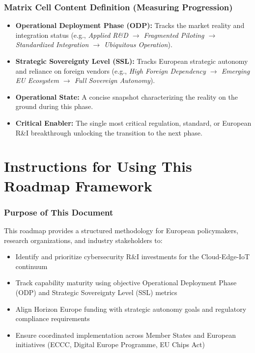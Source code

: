 \documentclass[12pt,a4paper]{report}
\begin{document}
\subsection*{Matrix Cell Content Definition (Measuring Progression)}
\begin{itemize}
    \item \textbf{Operational Deployment Phase (ODP):} Tracks the market reality and integration status (e.g., \textit{Applied R\&D $\rightarrow$ Fragmented Piloting $\rightarrow$ Standardized Integration $\rightarrow$ Ubiquitous Operation}).
    \item \textbf{Strategic Sovereignty Level (SSL):} Tracks European strategic autonomy and reliance on foreign vendors (e.g., \textit{High Foreign Dependency $\rightarrow$ Emerging EU Ecosystem $\rightarrow$ Full Sovereign Autonomy}).
    \item \textbf{Operational State:} A concise snapshot characterizing the reality on the ground during this phase.
    \item \textbf{Critical Enabler:} The single most critical regulation, standard, or European R\&I breakthrough unlocking the transition to the next phase.
\end{itemize}

\newpage
\chapter{Instructions for Using This Roadmap Framework}

\subsection*{Purpose of This Document}
This roadmap provides a structured methodology for European policymakers, research organizations, and industry stakeholders to:
\begin{itemize}
    \item Identify and prioritize cybersecurity R\&I investments for the Cloud-Edge-IoT continuum
    \item Track capability maturity using objective Operational Deployment Phase (ODP) and Strategic Sovereignty Level (SSL) metrics
    \item Align Horizon Europe funding with strategic autonomy goals and regulatory compliance requirements
    \item Ensure coordinated implementation across Member States and European initiatives (ECCC, Digital Europe Programme, EU Chips Act)
\end{itemize}
\end{document}

